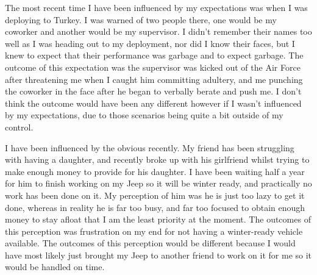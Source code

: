 \documentclass[12pt]{article}
\begin{document}
\par
The most recent time I have been influenced by my expectations was when I was deploying to Turkey. I was warned of two people there, one would be my coworker and another would be my supervisor. I didn't remember their names too well as I was heading out to my deployment, nor did I know their faces, but I knew to expect that their performance was garbage and to expect garbage. The outcome of this expectation was the supervisor was kicked out of the Air Force after threatening me when I caught him committing adultery, and me punching the coworker in the face after he began to verbally berate and push me. I don't think the outcome would have been any different however if I wasn't influenced by my expectations, due to those scenarios being quite a bit outside of my control.
\par
I have been influenced by the obvious recently. My friend has been struggling with having a daughter, and recently broke up with his girlfriend whilst trying to make enough money to provide for his daughter. I have been waiting half a year for him to finish working on my Jeep so it will be winter ready, and practically no work has been done on it. My perception of him was he is just too lazy to get it done, whereas in reality he is far too busy, and far too focused to obtain enough money to stay afloat that I am the least priority at the moment. The outcomes of this perception was frustration on my end for not having a winter-ready vehicle available. The outcomes of this perception would be different because I would have most likely just brought my Jeep to another friend to work on it for me so it would be handled on time.
\end{document}
